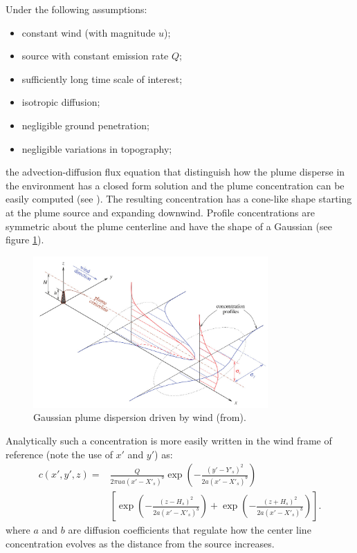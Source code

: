 \documentclass[a4paper,11pt]{report}
\begin{document}
Under the following assumptions:
\begin{itemize}
\item constant wind (with magnitude $u$);
\item source with constant emission rate $Q$;
\item sufficiently long time scale of interest;
\item isotropic diffusion;
\item negligible ground penetration; 
\item negligible variations in topography;
\end{itemize}
the advection-diffusion flux equation that distinguish how the plume disperse in the environment has a closed form solution and the plume concentration can be easily computed (see \cite{stockie2011}).
The resulting concentration has a cone-like shape starting at the plume source and expanding downwind. Profile concentrations are symmetric about the plume centerline and have the shape of a Gaussian (see figure \ref{fig:winddisp}).
\begin{figure}[b!]
\centering
\includegraphics[width=0.8\textwidth]{plumedistr.jpg}
\caption{Gaussian plume dispersion driven by wind (from\cite{stockie2011}).\label{fig:winddisp}}
\end{figure}

Analytically such a concentration is more easily written in the wind frame of reference (note the use of $x'$ and $y'$) as:
\begin{align}\label{eqn:singlesourcegaussiandispersion}
c(x',y',z) = &\frac{Q}{2\pi u a (x'-X'_s)^b}  \exp \left(-\frac{(y'-Y'_s)^2}{2 a (x'-X'_s)^b}\right) \nonumber \\
  & \left[ \exp \left(-\frac{(z-H_s)^2}{2 a (x'-X'_s)^b}\right) + \exp \left(-\frac{(z+H_s)^2}{2 a (x'-X'_s)^b}\right)\right]. 
\end{align}
where $a$ and $b$ are diffusion coefficients that regulate how the center line concentration evolves as the distance from the source increases.
\end{document}
